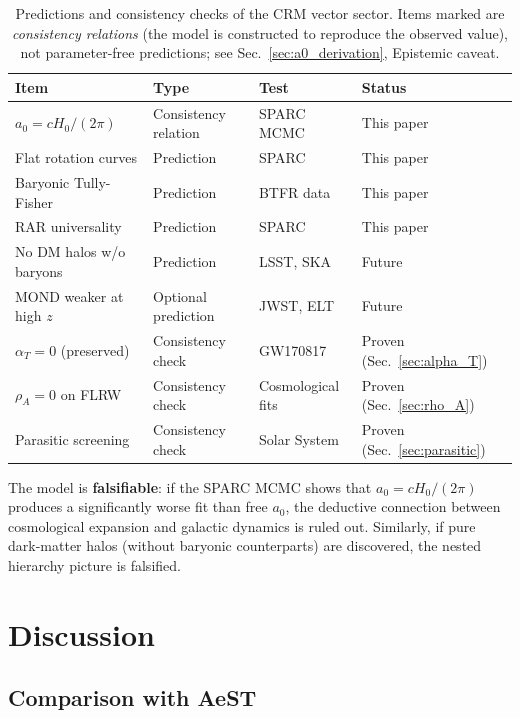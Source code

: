 \documentclass[aps,prd,twocolumn,superscriptaddress,nofootinbib]{revtex4-2}
\begin{document}
\begin{table}[tbp]
\caption{\label{tab:predictions}Predictions and consistency checks of the CRM vector sector.
Items marked \dag{} are \emph{consistency relations} (the model is constructed to reproduce the observed value), not parameter-free predictions; see Sec.~\ref{sec:a0_derivation}, Epistemic caveat.}
\begin{ruledtabular}
\begin{tabular}{llll}
Item & Type & Test & Status \\
\hline
$a_0 = cH_0/(2\pi)$\dag{} & Consistency relation & SPARC MCMC & This paper \\
Flat rotation curves & Prediction & SPARC & This paper \\
Baryonic Tully-Fisher & Prediction & BTFR data & This paper \\
RAR universality & Prediction & SPARC & This paper \\
No DM halos w/o baryons & Prediction & LSST, SKA & Future \\
MOND weaker at high $z$ & Optional prediction & JWST, ELT & Future \\
$\alpha_T = 0$ (preserved) & Consistency check & GW170817 & Proven (Sec.~\ref{sec:alpha_T}) \\
$\rho_A = 0$ on FLRW & Consistency check & Cosmological fits & Proven (Sec.~\ref{sec:rho_A}) \\
Parasitic screening & Consistency check & Solar System & Proven (Sec.~\ref{sec:parasitic}) \\
\end{tabular}
\end{ruledtabular}
\end{table}

The model is \textbf{falsifiable}: if the SPARC MCMC shows that $a_0 = cH_0/(2\pi)$ produces a significantly worse fit than free $a_0$, the deductive connection between cosmological expansion and galactic dynamics is ruled out. Similarly, if pure dark-matter halos (without baryonic counterparts) are discovered, the nested hierarchy picture is falsified.


\section{Discussion}
\label{sec:discussion}

\subsection{Comparison with AeST}
\end{document}

